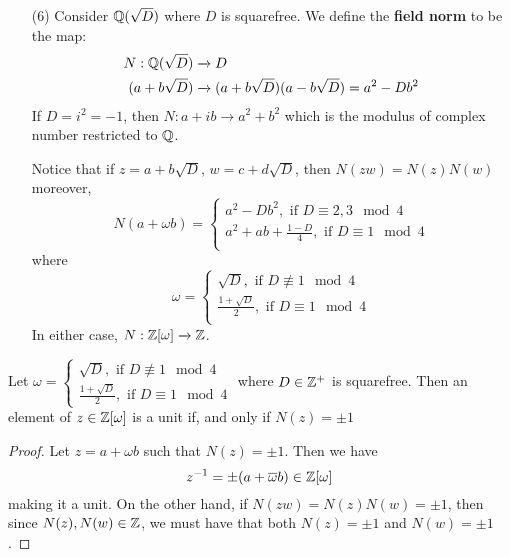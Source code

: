 \begin{example}
\begin{enumerate}
    \item[(6)] Consider $\mathbb{Q}(\sqrt{D})$ where $D$ is squarefree. We define
      the  \textbf{field norm} to be the map:
      \begin{align*}
        N: \mathbb{Q}(\sqrt{D}) & \xrightarrow{} D  \\
        (a+b\sqrt{D}) & \xrightarrow{} (a+b\sqrt{D})(a-b\sqrt{D})=a^2-Db^2 \\
      \end{align*}
      If $D=i^2=-1$, then  $N:a+ib \xrightarrow{} a^2+b^2$ which is the
      modulus of complex number restricted to $\mathbb{Q}$.

      Notice that if  $z=a+b\sqrt{D}$, $w=c+d\sqrt{D}$, then
      $N(zw)=N(z)N(w)$ moreover,
      \begin{equation*}
        N(a+\omega b)=\begin{cases}
          a^2-Db^2, \text{ if } D \equiv 2, 3 \mod{4} \\
          a^2+ab+\frac{1-D}{4}, \text{ if } D \equiv 1 \mod{4} \\
        \end{cases}
      \end{equation*}
      where
      \begin{equation*}
        \omega=\begin{cases}
          \sqrt{D}, \text{ if } D \not\equiv 1 \mod{4}   \\
          \frac{1+\sqrt{D}}{2}, \text{ if } D \equiv 1 \mod{4}    \\
        \end{cases}
      \end{equation*}
      In either case, $N:\mathbb{Z}[\omega] \xrightarrow{} \mathbb{Z}$.
  \end{enumerate}
\end{example}

\begin{proposition}\label{proposition_5.1.4}
  Let $\omega=\begin{cases} \sqrt{D}, \text{ if } D \not\equiv 1 \mod{4}   \\
    \frac{1+\sqrt{D}}{2}, \text{ if } D \equiv 1 \mod{4}
  \end{cases}$
  where $D \in \mathbb{Z}^+$ is squarefree. Then an element of $z \in \mathbb{Z}[\omega]$ is a
  unit if, and only if $N(z)=\pm1$
\end{proposition}
\begin{proof}
  Let $z=a+\omega b$ such that $N(z)=\pm 1$. Then we have
  \begin{equation*}
    z^{-1}=\pm (a+\overline{\omega}b) \in \mathbb{Z}[\omega]
  \end{equation*}
  making it a unit. On the other hand, if $N(zw)=N(z)N(w)=\pm 1$, then since
  $N(z),N(w) \in \mathbb{Z}$, we must have that both $N(z)=\pm 1$ and $N(w)=\pm 1$.
\end{proof}
